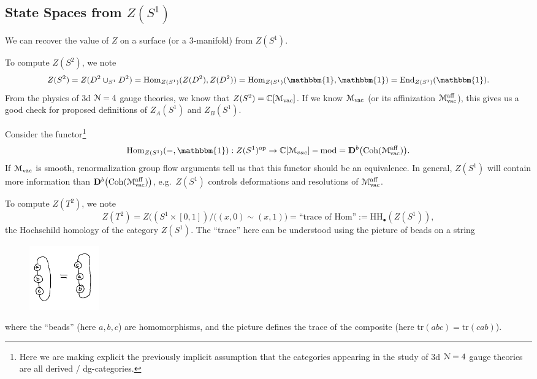 \subsection{State Spaces from $Z(S^1)$}

We can recover the value of $Z$ on a surface (or a $3$-manifold) from $Z(S^1)$.

\begin{example}
To compute $Z(S^2)$, we note
\begin{equation}
Z(S^2) = Z(D^2 \cup_{S^1} D^2) = \Hom_{Z(S^1)}(Z(D^2), Z(D^2)) = \Hom_{Z(S^1)}(\mathbbm{1}, \mathbbm{1}) = \mathrm{End}_{Z(S^1)}(\mathbbm{1}).
\end{equation}
From the physics of $3$d $\mathcal{N} = 4$ gauge theories, we know that $Z(S^2) = \mathbb{C}[\mathcal{M}_{\mathrm{vac}}]$.
If we know $\mathcal{M}_{\mathrm{vac}}$ (or its affinization $\mathcal{M}_{\mathrm{vac}}^{\mathrm{aff}}$), this gives us a good check for proposed definitions of $Z_A(S^1)$ and $Z_B(S^1)$.
\end{example}

Consider the functor\footnote{Here we are making explicit the previously implicit assumption that the categories appearing in the study of $3$d $\mathcal{N} = 4$ gauge theories are all derived / dg-categories.}
\begin{equation}
\Hom_{Z(S^1)}(-, \mathbbm{1}): Z(S^1)^{\mathrm{op}} \to \C[\cM_{vac}]-\mod = \bfD^b\big(\mathrm{Coh}(\cM_{\mathrm{vac}}^{\mathrm{aff}})\big).
\end{equation}
If $\mathcal{M}_{\mathrm{vac}}$ is smooth, renormalization group flow arguments tell us that this functor should be an equivalence.
In general, $Z(S^1)$ will contain more information than ${\mathbf{D}}^b\big(\mathrm{Coh}(\mathcal{M}_{\mathrm{vac}}^{\mathrm{aff}})\big)$, e.g.\ $Z(S^1)$ controls deformations and resolutions of $\mathcal{M}_{\mathrm{vac}}^{\mathrm{aff}}$.

\begin{example}
To compute $Z(T^2)$, we note
\begin{equation}
Z(T^2) = Z\big((S^1 \times [0, 1]) / ((x, 0) \sim (x, 1)\big) = \textrm{``trace of Hom''} := \mathrm{HH}_\bullet(Z(S^1)), 
\end{equation}
the Hochschild homology of the category $Z(S^1)$.
The ``trace'' here can be understood using the picture of beads on a string
\begin{figure}[htp]
    \centering
    \includegraphics[width=3cm]{frilec1graphics/trace.png}
\end{figure}

\noindent where the ``beads'' (here $a, b, c$) are homomorphisms, and the picture defines the trace of the composite (here $\mathrm{tr}(abc) = \mathrm{tr}(cab)$).
\end{example}

